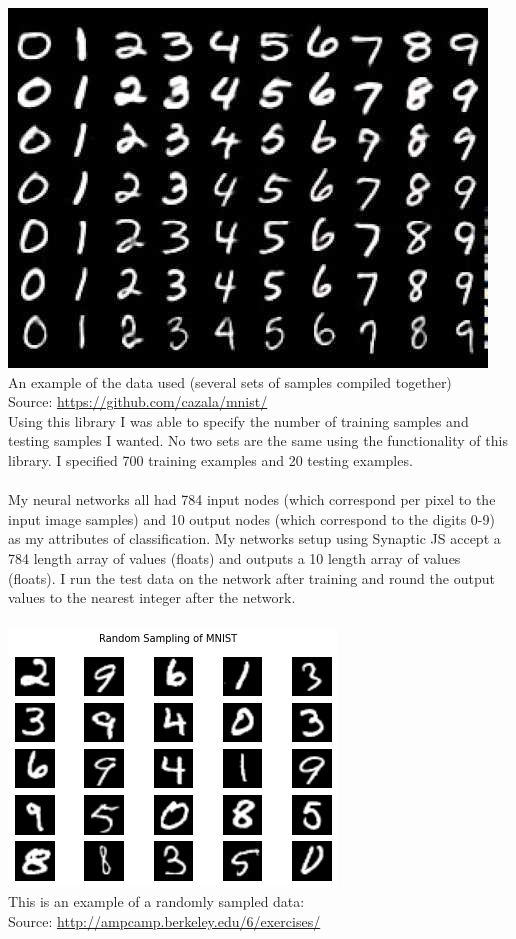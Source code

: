 \documentclass[11pt]{article}
\begin{document}
\begin{page}
\includegraphics[scale=0.7]{1}\\
An example of the data used (several sets of samples compiled together) \\
Source: \url{https://github.com/cazala/mnist/}\\

Using this library I was able to specify the number of training samples and testing samples I wanted. No two sets are the same using the functionality of this library. I specified 700 training examples and 20 testing examples. \\\\

My neural networks all had 784 input nodes (which correspond per pixel to the input image samples) and 10 output nodes (which correspond to the digits 0-9) as my attributes of classification. My networks setup using Synaptic JS accept a 784 length array of values (floats) and outputs a 10 length array of values (floats). I run the test data on the network after training and round the output values to the nearest integer after the network. \\\\

\includegraphics{2}\\
This is an example of a randomly sampled data:\\
Source: \url{http://ampcamp.berkeley.edu/6/exercises/} 


\end{page}
\end{document}
